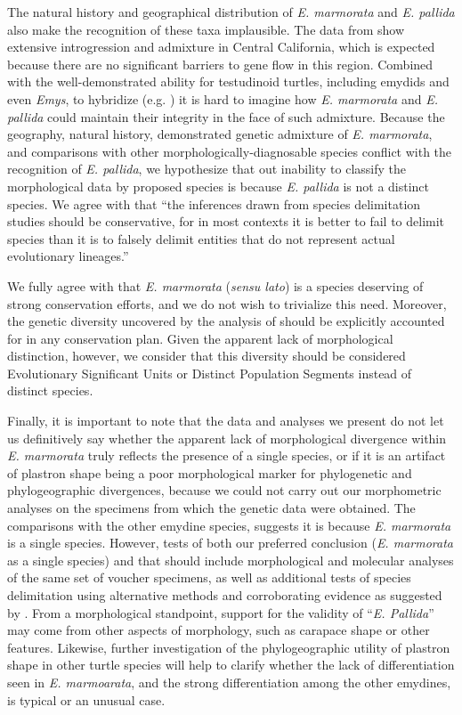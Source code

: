\documentclass[12pt,letterpaper]{article}
\begin{document}
The natural history and geographical distribution of \textit{E. marmorata} and \textit{E. pallida} also make the recognition of these taxa implausible. The data from \citet{Spinks2014} show extensive introgression and admixture in Central California, which is expected because there are no significant barriers to gene flow in this region. Combined with the well-demonstrated ability for testudinoid turtles, including emydids and even \textit{Emys}, to hybridize (e.g. \citealt{Buskirk2005,Spinks2009,Parham2013}) it is hard to imagine how \textit{E. marmorata} and \textit{E. pallida} could maintain their integrity in the face of such admixture. Because the geography, natural history, demonstrated genetic admixture of \textit{E. marmorata}, and comparisons with other morphologically-diagnosable species conflict with the recognition of \textit{E. pallida}, we hypothesize that out inability to classify the morphological data by proposed species is because \textit{E. pallida} is not a distinct species. We agree with \citet{Carstens2013} that ``the inferences drawn from species delimitation studies should be conservative, for in most contexts it is better to fail to delimit species than it is to falsely delimit entities that do not represent actual evolutionary lineages.'' 

We fully agree with \citet{Spinks2014} that \textit{E. marmorata} (\textit{sensu lato}) is a species deserving of strong conservation efforts, and we do not wish to trivialize this need. Moreover, the genetic diversity uncovered by the analysis of \citet{Spinks2014} should be explicitly accounted for in any conservation plan. Given the apparent lack of morphological distinction, however, we consider that this diversity should be considered Evolutionary Significant Units or Distinct Population Segments instead of distinct species.

Finally, it is important to note that the data and analyses we present do not let us definitively say whether the apparent lack of morphological divergence within \textit{E. marmorata} truly reflects the presence of a single species, or if it is an artifact of plastron shape being a poor morphological marker for phylogenetic and phylogeographic divergences, because we could not carry out our morphometric analyses on the specimens from which the genetic data were obtained. The comparisons with the other emydine species, suggests it is because \textit{E. marmorata} is a single species. However, tests of both our preferred conclusion (\textit{E. marmorata} as a single species) and that \citet{Spinks2014} should include morphological and molecular analyses of the same set of voucher specimens, as well as additional tests of species delimitation using alternative methods and corroborating evidence as suggested by \citet{Carstens2013}. From a morphological standpoint, support for the validity of ``\textit{E. Pallida}'' may come from other aspects of morphology, such as carapace shape or other features. Likewise, further investigation of the phylogeographic utility of plastron shape in other turtle species will help to clarify whether the lack of differentiation seen in \textit{E. marmoarata}, and the strong differentiation among the other emydines, is typical or an unusual case.
\end{document}
